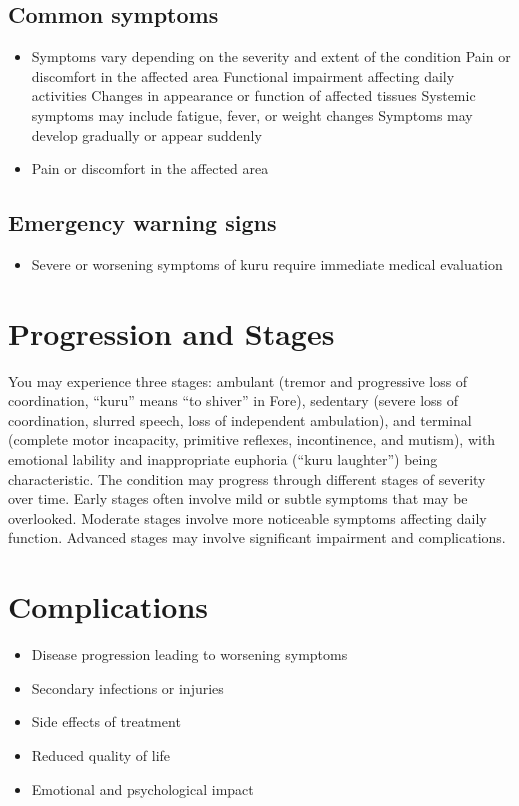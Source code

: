 \subsection{Common symptoms}
\begin{itemize}[noitemsep]
  \item Symptoms vary depending on the severity and extent of the condition Pain or discomfort in the affected area Functional impairment affecting daily activities Changes in appearance or function of affected tissues Systemic symptoms may include fatigue, fever, or weight changes Symptoms may develop gradually or appear suddenly
  \item Pain or discomfort in the affected area
  \end{itemize}

\subsection{Emergency warning signs}
\begin{itemize}[noitemsep]
  \item Severe or worsening symptoms of kuru require immediate medical evaluation
\end{itemize}
\section{Progression and Stages}
You may experience three stages: ambulant (tremor and progressive loss of coordination, ``kuru'' means ``to shiver'' in Fore), sedentary (severe loss of coordination, slurred speech, loss of independent ambulation), and terminal (complete motor incapacity, primitive reflexes, incontinence, and mutism), with emotional lability and inappropriate euphoria (``kuru laughter'') being characteristic. The condition may progress through different stages of severity over time. Early stages often involve mild or subtle symptoms that may be overlooked. Moderate stages involve more noticeable symptoms affecting daily function. Advanced stages may involve significant impairment and complications.
\section{Complications}
\begin{itemize}[noitemsep]
  \item Disease progression leading to worsening symptoms
  \item Secondary infections or injuries
  \item Side effects of treatment
  \item Reduced quality of life
  \item Emotional and psychological impact
\end{itemize}

